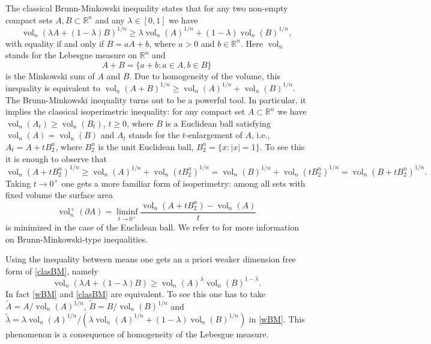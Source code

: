 \documentclass[11pt]{article}
\newcommand{\mb}[1]{\mathbb{{#1}}}
\newcommand{\1}{\mathbf{{1}}}
\DeclareMathOperator{\vol}{vol}
\theoremstyle{definition}
\begin{document}
The classical Brunn-Minkowski inequality states that for any two non-empty compact sets $A,B \subset \mb{R}^n$ and any $\lambda \in [0,1]$ we have
\begin{equation}\label{clasBM}
	\vol_n(\lambda A + (1-\lambda)B)^{1/n} \geq \lambda \vol_n(A)^{1/n} + (1-\lambda)\vol_n(B)^{1/n},
\end{equation}
with equality if and only if $B=aA+b$, where $a >0$ and  $b \in \mb{R}^n$. Here $\vol_n$ stands for the Lebesgue measure on $\mb{R}^n$ and
\[
A + B = \{a + b : a\in A, b \in B\}
\]
is the Minkowski sum of $A$ and $B$. Due to homogeneity of the volume, this inequality is equivalent to $\vol_n(A+B)^{1/n} \geq \vol_n(A)^{1/n}+\vol_n(B)^{1/n}$. The Brunn-Minkowski inequality turns out to be a powerful tool. In particular, it implies the classical isoperimetric inequality: for any compact set $A \subset \mb{R}^n$ we have $\vol_n(A_t) \geq \vol_n(B_t)$, $t \geq 0$, where $B$ is a Euclidean ball satisfying $\vol_n(A)=\vol_n(B)$ and $A_t$ stands for the $t$-enlargement of $A$, i.e., $A_t=A+tB_2^n$, where $B_2^n$ is the unit Euclidean ball, $B_2^n=\{x: |x|=1\}$. To see this it is enough to observe that
\[
	\vol_n(A+tB_2^n)^{1/n} \geq  \vol_n(A)^{1/n} +  \vol_n(tB_2^n)^{1/n}  =  \vol_n(B)^{1/n} +  \vol_n(tB_2^n)^{1/n} =\vol_n(B+tB_2^n)^{1/n}.
\]
Taking $t \to 0^+$ one gets a more familiar form of isoperimetry: among all sets with fixed volume the surface area
\[
	\vol_n^+(\partial A) = \liminf_{t \to 0^+} \frac{\vol_n(A + tB_2^n) - \vol_n(A)}{t}
\]
is minimized in the case of the Euclidean ball. We refer to \cite{G1} for more information on Brunn-Minkowski-type inequalities.

Using the inequality between means one gets an a priori weaker dimension free form of \eqref{clasBM}, namely
\begin{equation}\label{wBM}
	\vol_n(\lambda A + (1-\lambda)B) \geq \vol_n(A)^\lambda \vol_n(B)^{1-\lambda}.
\end{equation}
In fact \eqref{wBM} and \eqref{clasBM} are equivalent. To see this one has to take $\tilde{A}=A/\vol_n(A)^{1/n}$, $\tilde{B}=B/\vol_n(B)^{1/n}$ and $\tilde{\lambda}=\lambda \vol_n(A)^{1/n}/(\lambda \vol_n(A)^{1/n} + (1-\lambda) \vol_n(B)^{1/n})$ in \eqref{wBM}. This phenomenon is a consequence of homogeneity of the Lebesgue measure.
\end{document}
